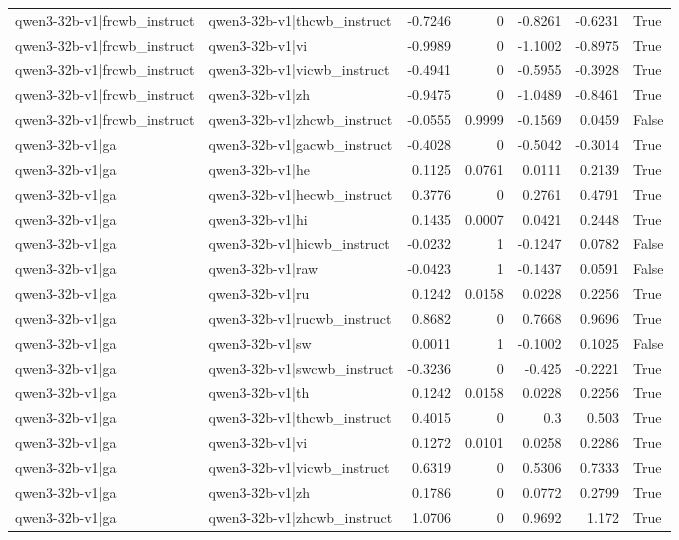\begin{table}
\begin{tabular}{l l r r r r l}
qwen3-32b-v1|frcwb_instruct & qwen3-32b-v1|thcwb_instruct & -0.7246 & 0 & -0.8261 & -0.6231 & True \\
qwen3-32b-v1|frcwb_instruct & qwen3-32b-v1|vi & -0.9989 & 0 & -1.1002 & -0.8975 & True \\
qwen3-32b-v1|frcwb_instruct & qwen3-32b-v1|vicwb_instruct & -0.4941 & 0 & -0.5955 & -0.3928 & True \\
qwen3-32b-v1|frcwb_instruct & qwen3-32b-v1|zh & -0.9475 & 0 & -1.0489 & -0.8461 & True \\
qwen3-32b-v1|frcwb_instruct & qwen3-32b-v1|zhcwb_instruct & -0.0555 & 0.9999 & -0.1569 & 0.0459 & False \\
qwen3-32b-v1|ga & qwen3-32b-v1|gacwb_instruct & -0.4028 & 0 & -0.5042 & -0.3014 & True \\
qwen3-32b-v1|ga & qwen3-32b-v1|he & 0.1125 & 0.0761 & 0.0111 & 0.2139 & True \\
qwen3-32b-v1|ga & qwen3-32b-v1|hecwb_instruct & 0.3776 & 0 & 0.2761 & 0.4791 & True \\
qwen3-32b-v1|ga & qwen3-32b-v1|hi & 0.1435 & 0.0007 & 0.0421 & 0.2448 & True \\
qwen3-32b-v1|ga & qwen3-32b-v1|hicwb_instruct & -0.0232 & 1 & -0.1247 & 0.0782 & False \\
qwen3-32b-v1|ga & qwen3-32b-v1|raw & -0.0423 & 1 & -0.1437 & 0.0591 & False \\
qwen3-32b-v1|ga & qwen3-32b-v1|ru & 0.1242 & 0.0158 & 0.0228 & 0.2256 & True \\
qwen3-32b-v1|ga & qwen3-32b-v1|rucwb_instruct & 0.8682 & 0 & 0.7668 & 0.9696 & True \\
qwen3-32b-v1|ga & qwen3-32b-v1|sw & 0.0011 & 1 & -0.1002 & 0.1025 & False \\
qwen3-32b-v1|ga & qwen3-32b-v1|swcwb_instruct & -0.3236 & 0 & -0.425 & -0.2221 & True \\
qwen3-32b-v1|ga & qwen3-32b-v1|th & 0.1242 & 0.0158 & 0.0228 & 0.2256 & True \\
qwen3-32b-v1|ga & qwen3-32b-v1|thcwb_instruct & 0.4015 & 0 & 0.3 & 0.503 & True \\
qwen3-32b-v1|ga & qwen3-32b-v1|vi & 0.1272 & 0.0101 & 0.0258 & 0.2286 & True \\
qwen3-32b-v1|ga & qwen3-32b-v1|vicwb_instruct & 0.6319 & 0 & 0.5306 & 0.7333 & True \\
qwen3-32b-v1|ga & qwen3-32b-v1|zh & 0.1786 & 0 & 0.0772 & 0.2799 & True \\
qwen3-32b-v1|ga & qwen3-32b-v1|zhcwb_instruct & 1.0706 & 0 & 0.9692 & 1.172 & True \\

\end{tabular}
\end{table}

